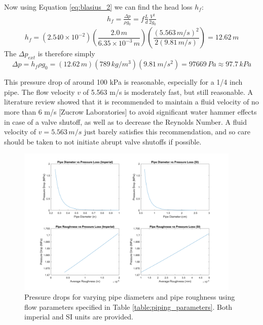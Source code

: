 \documentclass[9pt]{article} %
\numberwithin{equation}{section} %
\begin{document}
Now using Equation \ref{eq:blasius_2} we can find the head loss $h_{f}$:
\begin{align*}
h_{f} = \frac{\Delta p}{\rho g_{0}} = f \frac{L}{d} \frac{V^{2}}{2g_{0}}
\end{align*}
\begin{equation*}
h_{f} = (2.540 \times 10^{-2}) \left( \frac{2.0\, m}{6.35 \times 10^{-3}\, m} \right) \left( \frac{(5.563\, m/s)^{2}}{2 (9.81\, m/s)} \right) = 12.62 \, m
\end{equation*}
The $\Delta p_{ext}$ is therefore simply
\begin{equation*}
\Delta p = h_{f} \rho g_{0} = (12.62 \, m)(789 \, kg/m^{3})(9.81 \, m/s^{2}) = 97669 \, Pa \approx 97.7 \, kPa
\end{equation*}

This pressure drop of around 100 kPa is reasonable, especially for a 1/4 inch pipe. The flow velocity $v$ of 5.563 m/s is moderately fast, but still reasonable. A literature review showed that it is recommended to maintain a fluid velocity of no more than 6 m/s [Zucrow Laboratories] to avoid significant water hammer effects in case of a valve shutoff, as well as to decrease the Reynolds Number. A fluid velocity of $v = 5.563 \, m/s$ just barely satisfies this recommendation, and so care should be taken to not initiate abrupt valve shutoffs if possible. 

\begin{figure}[!htb]
\centering
\includegraphics[scale=0.55, width=0.95\textwidth]{pipe_pressure_graphs.png}
\caption{Pressure drops for varying pipe diameters and pipe roughness using flow parameters specified in Table \ref{table:piping_parameters}. Both imperial and SI units are provided.}
\label{fig:pipe_pressure_graphs}
\end{figure}
\end{document}
